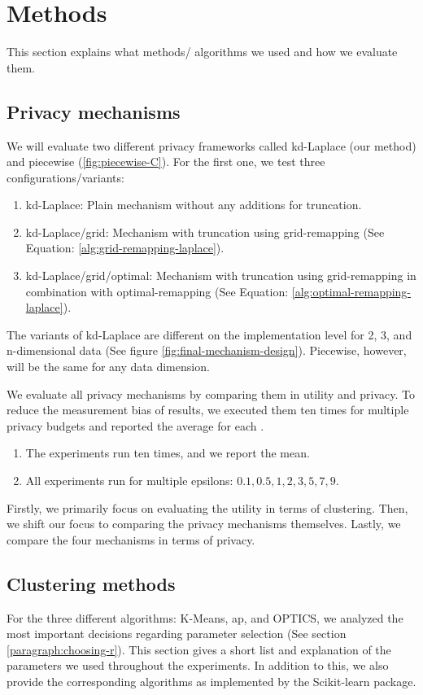 \section{Methods}
This section explains what methods/ algorithms we used and how we evaluate them.

\subsection{Privacy mechanisms}
We will evaluate two different privacy frameworks called kd-Laplace (our method) and piecewise (\ref{fig:piecewise-C}).
For the first one, we test three configurations/variants:
\begin{enumerate}
  \item kd-Laplace: Plain mechanism without any additions for truncation.
  \item kd-Laplace/grid: Mechanism with truncation using grid-remapping (See Equation: \ref{alg:grid-remapping-laplace}).
  \item kd-Laplace/grid/optimal: Mechanism with truncation using grid-remapping in combination with optimal-remapping (See Equation: \ref{alg:optimal-remapping-laplace}).
\end{enumerate}
The variants of kd-Laplace are different on the implementation level for 2, 3, and n-dimensional data (See figure \ref{fig:final-mechanism-design}).
Piecewise, however, will be the same for any data dimension.

We evaluate all privacy mechanisms by comparing them in utility and privacy.
To reduce the measurement bias of results, we executed them ten times for multiple privacy budgets and reported the average for each \citep{9679364}.
\begin{enumerate}
  \item The experiments run ten times, and we report the mean.
  \item All experiments run for multiple epsilons: ${0.1, 0.5, 1, 2, 3, 5, 7, 9}$.
\end{enumerate}
Firstly, we primarily focus on evaluating the utility in terms of clustering.
Then, we shift our focus to comparing the privacy mechanisms themselves.
Lastly, we compare the four mechanisms in terms of privacy.
\newpage
\subsection{Clustering methods}
For the three different algorithms: K-Means, \gls{ap}, and OPTICS, we analyzed the most important decisions regarding parameter selection (See section \ref{paragraph:choosing-r}).
This section gives a short list and explanation of the parameters we used throughout the experiments.
In addition to this, we also provide the corresponding algorithms as implemented by the Scikit-learn package.
